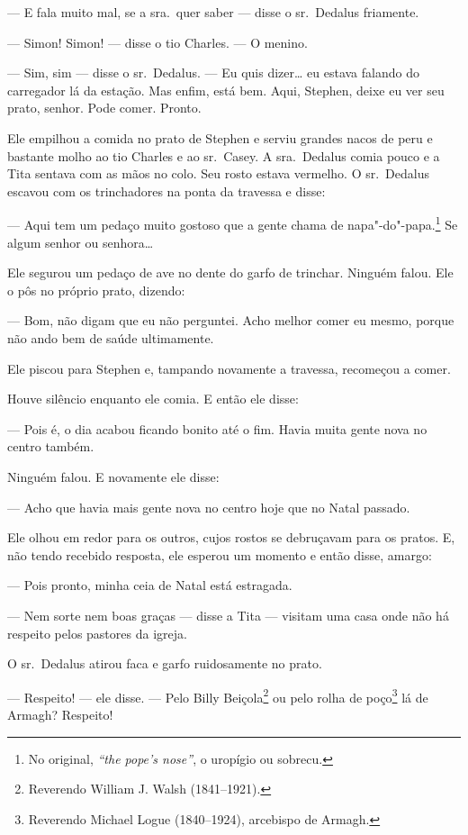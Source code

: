 --- E fala muito mal, se a sra.~quer saber --- disse o sr.~Dedalus friamente.

 --- Simon! Simon! --- disse o tio Charles. --- O menino.

 --- Sim, sim --- disse o sr.~Dedalus. --- Eu quis dizer\ldots{} eu estava falando do carregador lá da estação. Mas enfim, está bem. Aqui, Stephen, deixe eu ver seu prato, senhor. Pode comer. Pronto.

Ele empilhou a comida no prato de Stephen e serviu grandes nacos de peru
e bastante molho ao tio Charles e ao sr.~Casey. A sra.~Dedalus comia
pouco e a Tita sentava com as mãos no colo. Seu rosto estava vermelho.
O sr.~Dedalus escavou com os trinchadores na ponta da travessa e disse:

 --- Aqui tem um pedaço muito gostoso que a gente chama de
napa"-do"-papa.\footnote{ No original, \textit{“the pope’s nose”}, o
uropígio ou sobrecu.} Se algum senhor ou senhora\ldots{}

Ele segurou um pedaço de ave no dente do garfo de trinchar. Ninguém
falou. Ele o pôs no próprio prato, dizendo:

 --- Bom, não digam que eu não perguntei. Acho melhor comer eu mesmo,
porque não ando bem de saúde ultimamente.

Ele piscou para Stephen e, tampando novamente a travessa, recomeçou a
comer.

Houve silêncio enquanto ele comia. E então ele disse:

 --- Pois é, o dia acabou ficando bonito até o fim. Havia muita gente nova
no centro também.

Ninguém falou. E novamente ele disse:

 --- Acho que havia mais gente nova no centro hoje que no Natal passado.

Ele olhou em redor para os outros, cujos rostos se debruçavam para os
pratos. E, não tendo recebido resposta, ele esperou um momento e então
disse, amargo:

 --- Pois pronto, minha ceia de Natal está estragada.

 --- Nem sorte nem boas graças --- disse a Tita --- visitam uma casa onde não há respeito pelos pastores da igreja.

O sr.~Dedalus atirou faca e garfo ruidosamente no prato.

 --- Respeito! --- ele disse. --- Pelo Billy Beiçola\footnote{ Reverendo William		
J. Walsh (1841--1921).} ou pelo rolha de poço\footnote{ Reverendo Michael Logue
(1840--1924), arcebispo de Armagh.} lá de Armagh? Respeito!

